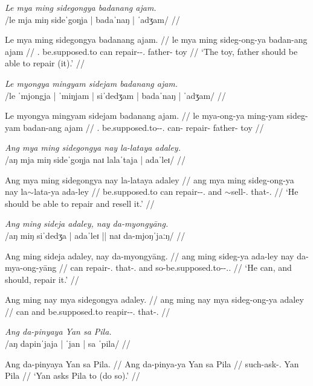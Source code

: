 \documentclass[12pt,a4paper]{scrartcl}
\newcommand{\PargI}{{\Parg}.{\Inan}}
\newcommand{\PatTI}{{\PatT}.{\Inan}}
\newcommand{\TsgM}{{\Tsg}.{\M}}
\newcommand{\til}{$\sim$} %
\begin{document}
\pex
\a\begingl
\glpreamble \textit{Le mya ming sidegongya badanang ajam.} \\
	/le mja miŋ sideˈgoŋja | badaˈnaŋ | ˈadʒam/ //

\gla Le mya ming sidegongya badanang ajam. //
\glb le mya ming sideg-ong-ya badan-ang ajam //
\glc \PatTI{} be.supposed.to can repair-\Irr{}-\TsgM{} father-\Aarg{} toy //
\glft `The toy, father should be able to repair (it).' //
\endgl

\a\ljudge*\begingl
\glpreamble \textit{Le myongya mingyam sidejam badanang ajam.} \\
	/le ˈmjongja | ˈmiŋjam | siˈdedʒam | badaˈnaŋ | ˈadʒam/ //

\gla Le myongya mingyam sidejam badanang ajam. //
\glb le mya-ong-ya ming-yam sideg-yam badan-ang ajam //
\glc \PatTI{} be.supposed.to-\Irr{}-\TsgM{} can-\Ptcp{} repair-\Ptcp{} father-\Aarg{} toy //
\endgl\xe

\ex\begingl
\glpreamble \textit{Ang mya ming sidegongya nay la-lataya adaley.} \\
	/aŋ mja miŋ sideˈgoŋja naɪ lalaˈtaja | adaˈleɪ/ //

\gla Ang mya ming sidegongya nay la-lataya adaley //
\glb ang mya ming sideg-ong-ya nay la\til{}lata-ya ada-ley //
\glc \AgtT{} be.supposed.to can repair-\Irr{}-\TsgM{} and \Iter{}\til{}sell-\TsgM{} that-\PargI{} //
\glft `He should be able to repair and resell it.' //
\endgl\xe

\pex
\a\begingl
\glpreamble \textit{Ang ming sideja adaley, nay da-myongyāng.} \\
	/aŋ miŋ siˈdedʒa | adaˈleɪ || naɪ da-mjoŋˈjaːŋ/ //

\gla Ang ming sideja adaley, nay da-myongyāng. //
\glb ang ming sideg-ya ada-ley nay da-mya-ong-yāng //
\glc \AgtT{} can repair-\TsgM{} that-\PargI{} and so-be.supposed.to-\Irr{}-\TsgM{}.\Aarg{} //
\glft `He can, and should, repair it.' //
\endgl

\a\ljudge*\begingl
\gla Ang ming nay mya sidegongya adaley. //
\glb ang ming nay mya sideg-ong-ya adaley //
\glc \AgtT{} can and be.supposed.to reapir-\Irr{}-\TsgM{} that-\PargI{} //
\endgl
\xe

\ex\begingl
\glpreamble \textit{Ang da-pinyaya Yan sa Pila.} \\
	/aŋ dapinˈjaja | ˈjan | sa ˈpila/ //

	\gla Ang da-pinyaya Yan sa Pila. //
	\glb Ang da-pinya-ya Yan sa Pila //
	\glc \AgtT{} such-ask-\TsgM{} Yan \Parg{} Pila //
	\glft `Yan asks Pila to (do so).' //
\endgl\xe
\end{document}

